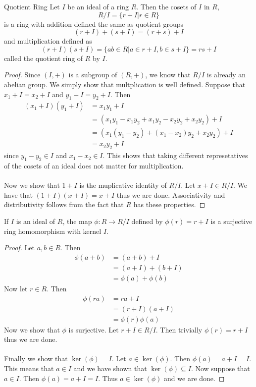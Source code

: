 \documentclass[a4paper]{article}
\begin{document}
\begin{prp}{Quotient Ring}{} Let $I$ be an ideal of a ring $R$. Then the cosets of $I$ in $R$, $$R/I=\{r+I|r\in R\}$$ is a ring with addition defined the same as quotient groups $$(r+I)+(s+I)=(r+s)+I$$ and multiplication defined as $$(r+I)(s+I)=\{ab\in R|a\in r+I,b\in s+I\}=rs+I$$ called the quotient ring of $R$ by $I$. \tcbline
\begin{proof}
Since $(I,+)$ is a subgroup of $(R,+)$, we know that $R/I$ is already an abelian group. We simply show that multplication is well defined. Suppose that $x_1+I=x_2+I$ and $y_1+I=y_2+I$. Then 
\begin{align*}
(x_1+I)(y_1+I)&=x_1y_1+I\\
&=(x_1y_1-x_1y_2+x_1y_2-x_2y_2+x_2y_2)+I\\
&=(x_1(y_1-y_2)+(x_1-x_2)y_2+x_2y_2)+I\\
&=x_2y_2+I
\end{align*}
since $y_1-y_2\in I$ and $x_1-x_2\in I$. This shows that taking different represetatives of the cosets of an ideal does not matter for multiplication. \\~\\
Now we show that $1+I$ is the muplicative identity of $R/I$. Let $x+I\in R/I$. We have that $(1+I)(x+I)=x+I$ thus we are done. Associativity and distributivity follows from the fact that $R$ has these properties. 
\end{proof}
\end{prp}

\begin{thm}{}{} If $I$ is an ideal of $R$, the map $\phi:R\to R/I$ defined by $\phi(r)=r+I$ is a surjective ring homomorphism with kernel $I$. \tcbline
\begin{proof}
Let $a,b\in R$. Then 
\begin{align*}
\phi(a+b)&=(a+b)+I\\
&=(a+I)+(b+I)\\
&=\phi(a)+\phi(b)
\end{align*}
Now let $r\in R$. Then
\begin{align*}
\phi(ra)&=ra+I\\
&=(r+I)(a+I)\\
&=\phi(r)\phi(a)
\end{align*}
Now we show that $\phi$ is surjective. Let $r+I\in R/I$. Then trivially $\phi(r)=r+I$ thus we are done. \\~\\
Finally we show that $\ker(\phi)=I$. Let $a\in\ker(\phi)$. Then $\phi(a)=a+I=I$. This means that $a\in I$ and we have shown that $\ker(\phi)\subseteq I$. Now suppose that $a\in I$. Then $\phi(a)=a+I=I$. Thus $a\in\ker(\phi)$ and we are done. 
\end{proof}
\end{thm}
\end{document}
